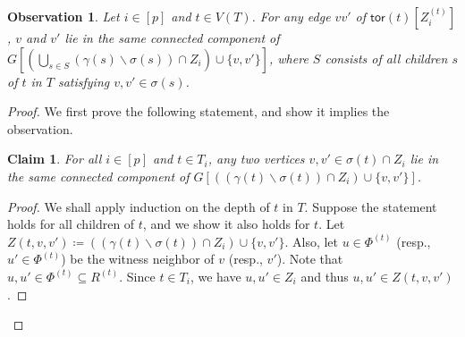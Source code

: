 \documentclass[a4paper,11pt]{article}
\numberwithin{lemma}{section}
\newtheorem{observation}[lemma]{Observation}
\newtheorem{claim}[theorem]{Claim}
\newenvironment{claimproof}{\begin{proof}\renewcommand{\qedsymbol}{$\lrcorner$}}{\end{proof}}
\newcommand{\tor}{\mathsf{tor}}
\begin{document}
\begin{observation} \label{obs-connectedbottom}
Let $i \in [p]$ and $t \in V(T)$.
For any edge $vv'$ of $\tor(t)[Z_i^{(t)}]$, $v$ and $v'$ lie in the same connected component of $G[(\bigcup_{s \in S} (\gamma(s) \backslash \sigma(s)) \cap Z_i) \cup \{v,v'\}]$, where $S$ consists of all children $s$ of $t$ in $T$ satisfying $v,v' \in \sigma(s)$.
\end{observation}
\begin{proof}
We first prove the following statement, and show it implies the observation.

\begin{claim}
 \label{claim:realize-fake-edge}
 For all $i \in [p]$ and $t \in T_i$, any two vertices $v,v' \in \sigma(t) \cap Z_i$ lie in the same connected component of $G[((\gamma(t) \backslash \sigma(t)) \cap Z_i) \cup \{v,v'\}]$.
\end{claim}
\begin{claimproof}
We shall apply induction on the depth of $t$ in $T$.
Suppose the statement holds for all children of $t$, and we show it also holds for $t$.
Let $Z(t,v,v') \coloneqq ((\gamma(t) \backslash \sigma(t)) \cap Z_i) \cup \{v,v'\}$.
Also, let $u \in \varPhi^{(t)}$ (resp., $u' \in \varPhi^{(t)}$) be the witness neighbor of $v$ (resp., $v'$).
Note that $u,u' \in \varPhi^{(t)} \subseteq R^{(t)}$.
Since $t \in T_i$, we have $u,u' \in Z_i$ and thus $u,u' \in Z(t,v,v')$.


\end{claimproof}
\end{proof}
\end{document}
